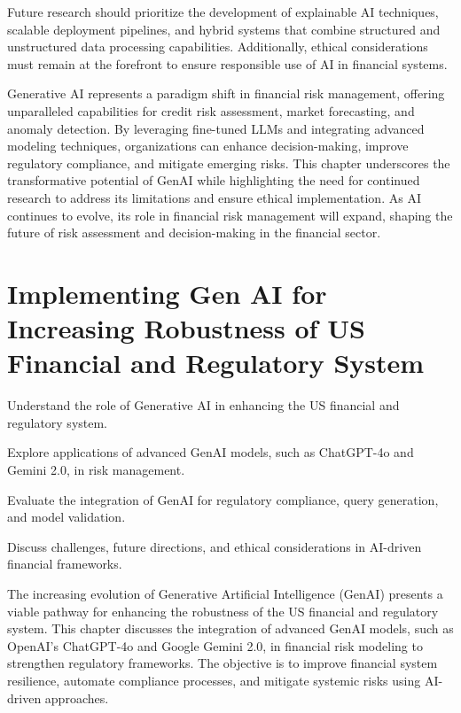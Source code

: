 \documentclass[a4paper,headinclude=on,footinclude=on,12pt,oneside]{scrbook}
\begin{document}
	Future research should prioritize the development of explainable AI techniques, scalable deployment pipelines, and hybrid systems that combine structured and unstructured data processing capabilities. Additionally, ethical considerations must remain at the forefront to ensure responsible use of AI in financial systems.
	
	
	Generative AI represents a paradigm shift in financial risk management, offering unparalleled capabilities for credit risk assessment, market forecasting, and anomaly detection. By leveraging fine-tuned LLMs and integrating advanced modeling techniques, organizations can enhance decision-making, improve regulatory compliance, and mitigate emerging risks. This chapter underscores the transformative potential of GenAI while highlighting the need for continued research to address its limitations and ensure ethical implementation. As AI continues to evolve, its role in financial risk management will expand, shaping the future of risk assessment and decision-making in the financial sector.
	
	
	\chapter{Implementing Gen AI for Increasing Robustness of US Financial and Regulatory System}
	
	\begin{arrows}
		\item Understand the role of Generative AI in enhancing the US financial and regulatory system.
		\item Explore applications of advanced GenAI models, such as ChatGPT-4o and Gemini 2.0, in risk management.
		\item Evaluate the integration of GenAI for regulatory compliance, query generation, and model validation.
		\item Discuss challenges, future directions, and ethical considerations in AI-driven financial frameworks.
	\end{arrows}
	
	The increasing evolution of Generative Artificial Intelligence (GenAI) presents a viable pathway for enhancing the robustness of the US financial and regulatory system. This chapter discusses the integration of advanced GenAI models, such as OpenAI’s ChatGPT-4o and Google Gemini 2.0, in financial risk modeling to strengthen regulatory frameworks. The objective is to improve financial system resilience, automate compliance processes, and mitigate systemic risks using AI-driven approaches.
	
\end{document}
